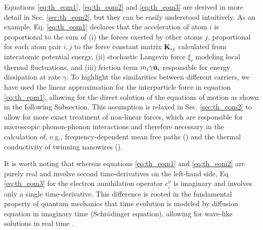 Equations \eqref{eq:th_eom1}, \eqref{eq:th_eom2} and \eqref{eq:th_eom3} are derived in more detail in Sec. \ref{sec:th_eom2}, but they can be easily understood intuitively. As an example, Eq. \eqref{eq:th_eom1} declares that the acceleration of atom $i$ is proportional to the sum of (i) the forces exerted by other atoms $j$, proportional for each atom pair $i,j$ to the force constant matrix $\mathbf{K}_{ij}$ calculated from interatomic potential energy, (ii) stochastic Langevin force $\xi_i$ modeling local thermal fluctuations, and (iii) friction term $m_i \gamma \dot{\mathbf{u}}_i$ responsible for energy dissipation at rate $\gamma$. To highlight the similarities between different carriers, we have used the linear approximation for the interparticle force in equation \eqref{eq:th_eom1}, allowing for the direct solution of the equations of motion as shown in the following Subsection. This assumption is relaxed in Sec. \ref{sec:th_eom2} to allow for more exact treatment of non-linear forces, which are responsible for microscopic phonon-phonon interactions and therefore necessary in the calculation of, e.g., frequency-dependent mean free paths () and the thermal conductivity of twinning nanowires (). 

It is worth noting that whereas equations \eqref{eq:th_eom1} and \eqref{eq:th_eom2} are purely real and involve second time-derivatives on the left-hand side, Eq. \eqref{eq:th_eom3} for the electron annihilation operator $c_i^{\sigma}$ is imaginary and involves only a single time-derivative. This difference is rooted in the fundamental property of quantum mechanics that time evolution is modeled by diffusion equation in imaginary time (Schr\"odinger equation), allowing for wave-like solutions in real time \cite{ballentine}.

